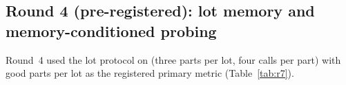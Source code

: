 \subsection{Round 4 (pre-registered): lot memory and memory-conditioned probing}
\label{sec:res-r7}

Round~4 used the lot protocol on  (three parts per lot, four calls per part) with good parts
per lot as the registered primary metric (Table~\ref{tab:r7}).

\begin{table}[!htbp]
  \centering\small
  \setlength{\tabcolsep}{4pt}
  \caption{Round 4, pre-registered: good parts per lot (3 parts, $n = 30$ paired lots per robot). ``No lot''
  is the memory ablation (lot fusion off). Oracle uses true lot physics (labelled). Bold: CI above 0.}
  \label{tab:r7}
\end{table}

